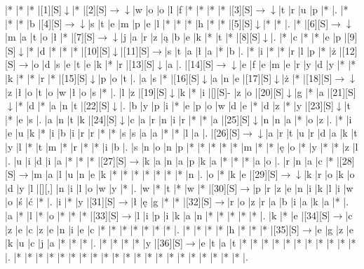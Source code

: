 \documentclass[11pt]{article}
\newcommand\drarr{$\rightarrow \!\!\!\!\! \downarrow$}
\newcommand\rarr{$\rightarrow$}
\newcommand\darr{$\downarrow$}
\begin{document}
\noindent\begin{Puzzle}{20}{22}|*	|*	|*	|[1][S]\darr	|*	|[2][S]\drarr	|w	|o	|o	|l	|f	|*	|*	|*	|*	|[3][S]\drarr	|t	|r	|u	|p	|*	|.
|*	|*	|*	|b	|[4][S]\drarr	|s	|t	|e	|m	|p	|e	|l	|*	|*	|*	|h	|*	|*	|[5][S]\darr	|*	|*	|.
|*	|[6][S]\drarr	|m	|a	|t	|o	|ł	|*	|[7][S]\drarr	|j	|a	|r	|z	|ą	|b	|e	|k	|*	|t	|*	|[8][S]\darr	|.
|*	|c	|*	|*	|e	|p	|[9][S]\darr	|*	|d	|*	|*	|*	|[10][S]\darr	|[11][S]\rarr	|s	|t	|a	|ł	|a	|*	|b	|.
|*	|i	|*	|*	|r	|l	|p	|*	|ż	|[12][S]\rarr	|o	|d	|s	|e	|t	|e	|k	|*	|r	|[13][S]\darr	|a	|.
|[14][S]\drarr	|e	|f	|e	|m	|e	|r	|y	|d	|y	|*	|*	|k	|*	|*	|r	|*	|[15][S]\darr	|p	|o	|t	|.
|a	|s	|*	|[16][S]\darr	|a	|n	|e	|[17][S]\darr	|ż	|*	|[18][S]\drarr	|z	|ł	|o	|t	|o	|w	|ł	|o	|s	|*	|.
|l	|z	|[19][S]\darr	|k	|*	|i	|[][S]-	|z	|o	|[20][S]\darr	|g	|*	|a	|[21][S]\darr	|*	|d	|*	|a	|n	|t	|[22][S]\darr	|.
|b	|y	|p	|i	|*	|e	|p	|o	|w	|d	|e	|*	|d	|z	|*	|y	|[23][S]\darr	|t	|*	|e	|s	|.
|a	|n	|t	|k	|[24][S]\darr	|c	|a	|r	|n	|i	|r	|*	|*	|a	|[25][S]\darr	|n	|n	|a	|*	|o	|z	|.
|*	|i	|e	|u	|k	|*	|i	|b	|i	|r	|r	|*	|*	|s	|s	|a	|a	|*	|*	|l	|a	|.
|[26][S]\drarr	|a	|r	|t	|u	|r	|d	|a	|k	|t	|y	|l	|*	|t	|m	|*	|r	|*	|*	|i	|b	|.
|s	|n	|o	|n	|p	|*	|*	|*	|*	|*	|m	|*	|*	|ę	|o	|*	|y	|*	|*	|z	|l	|.
|u	|i	|d	|i	|a	|*	|*	|*	|[27][S]\rarr	|k	|a	|n	|a	|p	|k	|a	|*	|*	|*	|a	|o	|.
|r	|n	|a	|c	|*	|[28][S]\rarr	|m	|a	|l	|u	|n	|e	|k	|*	|*	|*	|*	|*	|*	|*	|n	|.
|o	|*	|k	|e	|[29][S]\drarr	|k	|r	|o	|k	|o	|d	|y	|l	|[][,]{ }	|n	|i	|l	|o	|w	|y	|*	|.
|w	|*	|t	|*	|w	|*	|[30][S]\rarr	|p	|r	|z	|e	|n	|i	|k	|l	|i	|w	|o	|ś	|ć	|*	|.
|i	|*	|y	|[31][S]\rarr	|ł	|ę	|g	|*	|*	|[32][S]\rarr	|r	|o	|z	|r	|a	|b	|i	|a	|k	|a	|*	|.
|a	|*	|l	|*	|o	|*	|*	|*	|[33][S]\rarr	|l	|i	|p	|i	|k	|a	|n	|*	|*	|*	|*	|*	|.
|k	|*	|e	|[34][S]\rarr	|c	|z	|e	|c	|z	|e	|n	|i	|e	|c	|*	|*	|*	|*	|*	|*	|*	|.
|*	|*	|*	|*	|h	|*	|*	|*	|[35][S]\rarr	|e	|g	|z	|e	|k	|u	|c	|j	|a	|*	|*	|*	|.
|*	|*	|*	|*	|y	|[36][S]\rarr	|e	|t	|a	|t	|*	|*	|*	|*	|*	|*	|*	|*	|*	|*	|*	|.
|*	|*	|*	|*	|*	|*	|*	|*	|*	|*	|*	|*	|*	|*	|*	|*	|*	|*	|*	|*	|*	|.\end{Puzzle}

\newpage
\end{document}
